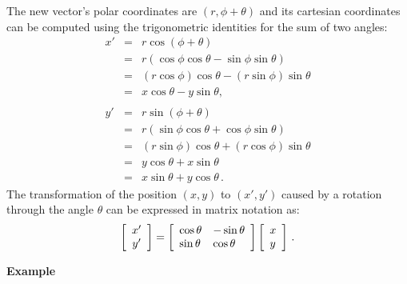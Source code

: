 \documentclass[11pt,a4paper]{report}
\begin{document}
The new vector's polar coordinates are $(r,\phi+\theta)$ and its cartesian coordinates can be computed using the trigonometric identities for the sum of two angles:
\begin{eqnarray*}
x' &=& r \cos(\phi + \theta)\\
&=& r (\cos\phi\cos\theta - \sin\phi\sin\theta)\\
&=& (r \cos\phi)\cos\theta - (r\sin\phi)\sin\theta\\
&=& x \cos\theta - y \sin\theta,\\
&& \mbox{}\\
y' &=& r \sin(\phi + \theta)\\
&=& r (\sin\phi\cos\theta + \cos\phi\sin\theta)\\
&=& (r \sin\phi)\cos\theta + (r \cos\phi)\sin\theta\\
&=& y \cos\theta + x \sin\theta\\
&=&  x \sin\theta + y \cos\theta\,.
\end{eqnarray*}
The transformation of the position $(x,y)$ to $(x',y')$ caused by a rotation through the angle $\theta$ can be expressed in matrix notation  as:
\[
\left[ 
\begin{array}{c} x'\\ y' \end{array}
\right] = 
\left[\begin{array}{l} \cos\theta \\ \sin\theta \end{array}\\
\begin{array}{l} -\sin\theta \\ \cos\theta \end{array}\\
\right]
\left[\begin{array}{l} x \\ y \end{array}\\
\right]\,.
\]


\textbf{Example}
\end{document}
